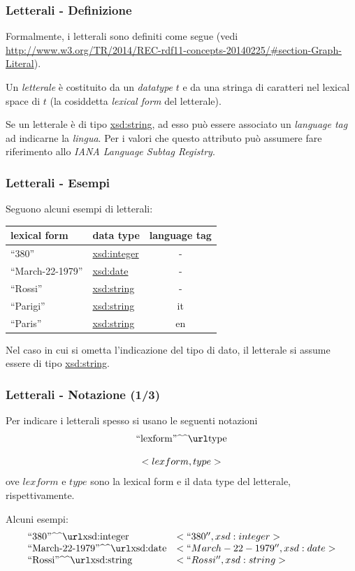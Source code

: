 \documentclass[8pt]{beamer}
\begin{document}
\begin{frame}
\frametitle{Letterali - Definizione}
Formalmente, i letterali sono definiti come segue (vedi 
\url{http://www.w3.org/TR/2014/REC-rdf11-concepts-20140225/\#section-Graph-Literal}).
\vspace{\baselineskip}

Un \emph{letterale} \`e costituito da un \emph{datatype} $t$ e da una 
stringa di caratteri nel lexical space di $t$ (la cosiddetta \emph{lexical form}
del letterale).
\vspace{\baselineskip}

Se un letterale \`e di tipo \url{xsd:string}, ad esso pu\`o essere associato un
\emph{language tag} ad indicarne la \emph{lingua}. Per i valori che questo attributo pu\`o
assumere fare riferimento allo \emph{IANA Language Subtag Registry}.
\end{frame}

\begin{frame}
\frametitle{Letterali - Esempi}
Seguono alcuni esempi di letterali:

\begin{center}
\begin{tabular}{|l|l|c|}
  \hline
  \textbf{lexical form} & \textbf{data type} & \textbf{language tag}\\
  \hline
  ``380'' & \url{xsd:integer} & - \\
  ``March-22-1979'' & \url{xsd:date} & - \\
  ``Rossi'' & \url{xsd:string} & - \\
  ``Parigi'' & \url{xsd:string} & it \\
  ``Paris'' & \url{xsd:string} & en\\
  \hline
\end{tabular}
\end{center}
\vspace{\baselineskip}

Nel caso in cui si ometta l'indicazione del tipo di dato, il letterale si assume essere
di tipo \url{xsd:string}.
\end{frame}


\begin{frame}
\frametitle{Letterali - Notazione (1/3)}
Per indicare i letterali spesso si usano le seguenti notazioni
\[
 \begin{array}{c}
   \literal{lexform}{type} \\
   \\
  < lexform, type >
 \end{array}
\]
ove $lexform$ e $type$ sono la lexical form e il data type del letterale, rispettivamente.
\vspace{\baselineskip}

Alcuni esempi:
\[
\begin{array}{ll}
 \literal{380}{xsd:integer} & <``380'', xsd:integer>\\
 \literal{March-22-1979}{xsd:date} & <``March-22-1979'', xsd:date>\\
 \literal{Rossi}{xsd:string} & <``Rossi'', xsd:string>
\end{array}
\]
\end{frame}
\end{document}
